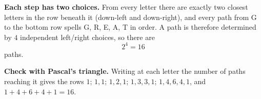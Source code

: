\textbf{Each step has two choices.} From every letter there are exactly two closest letters in the row beneath it (down-left and down-right), and every path from G to the bottom row spells G, R, E, A, T in order. A path is therefore determined by $4$ independent left/right choices, so there are
\[
2^4=\boxed{16}
\]
paths.

\textbf{Check with Pascal's triangle.} Writing at each letter the number of paths reaching it gives the rows $1$; $1,1$; $1,2,1$; $1,3,3,1$; $1,4,6,4,1$, and $1+4+6+4+1=16$.

